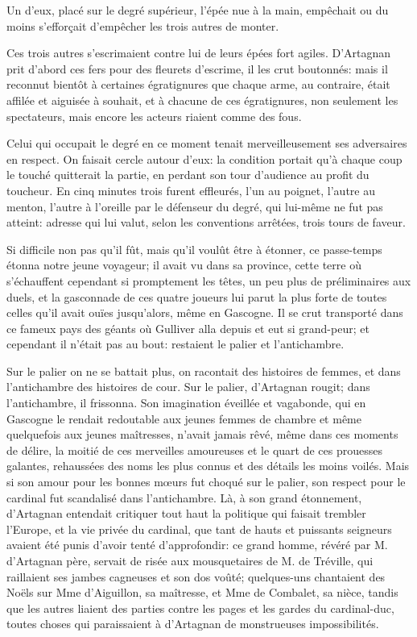 Un d'eux, placé sur le degré supérieur, l'épée nue à la main, empêchait ou du moins s'efforçait d'empêcher les trois autres de monter. 

Ces trois autres s'escrimaient contre lui de leurs épées fort agiles. D'Artagnan prit d'abord ces fers pour des fleurets d'escrime, il les crut boutonnés: mais il reconnut bientôt à certaines égratignures que chaque arme, au contraire, était affilée et aiguisée à souhait, et à chacune de ces égratignures, non seulement les spectateurs, mais encore les acteurs riaient comme des fous. 

Celui qui occupait le degré en ce moment tenait merveilleusement ses adversaires en respect. On faisait cercle autour d'eux: la condition portait qu'à chaque coup le touché quitterait la partie, en perdant son tour d'audience au profit du toucheur. En cinq minutes trois furent effleurés, l'un au poignet, l'autre au menton, l'autre à l'oreille par le défenseur du degré, qui lui-même ne fut pas atteint: adresse qui lui valut, selon les conventions arrêtées, trois tours de faveur. 

Si difficile non pas qu'il fût, mais qu'il voulût être à étonner, ce passe-temps étonna notre jeune voyageur; il avait vu dans sa province, cette terre où s'échauffent cependant si promptement les têtes, un peu plus de préliminaires aux duels, et la gasconnade de ces quatre joueurs lui parut la plus forte de toutes celles qu'il avait ouïes jusqu'alors, même en Gascogne. Il se crut transporté dans ce fameux pays des géants où Gulliver alla depuis et eut si grand-peur; et cependant il n'était pas au bout: restaient le palier et l'antichambre. 

Sur le palier on ne se battait plus, on racontait des histoires de femmes, et dans l'antichambre des histoires de cour. Sur le palier, d'Artagnan rougit; dans l'antichambre, il frissonna. Son imagination éveillée et vagabonde, qui en Gascogne le rendait redoutable aux jeunes femmes de chambre et même quelquefois aux jeunes maîtresses, n'avait jamais rêvé, même dans ces moments de délire, la moitié de ces merveilles amoureuses et le quart de ces prouesses galantes, rehaussées des noms les plus connus et des détails les moins voilés. Mais si son amour pour les bonnes mœurs fut choqué sur le palier, son respect pour le cardinal fut scandalisé dans l'antichambre. Là, à son grand étonnement, d'Artagnan entendait critiquer tout haut la politique qui faisait trembler l'Europe, et la vie privée du cardinal, que tant de hauts et puissants seigneurs avaient été punis d'avoir tenté d'approfondir: ce grand homme, révéré par M. d'Artagnan père, servait de risée aux mousquetaires de M. de Tréville, qui raillaient ses jambes cagneuses et son dos voûté; quelques-uns chantaient des Noëls sur Mme d'Aiguillon, sa maîtresse, et Mme de Combalet, sa nièce, tandis que les autres liaient des parties contre les pages et les gardes du cardinal-duc, toutes choses qui paraissaient à d'Artagnan de monstrueuses impossibilités. 

